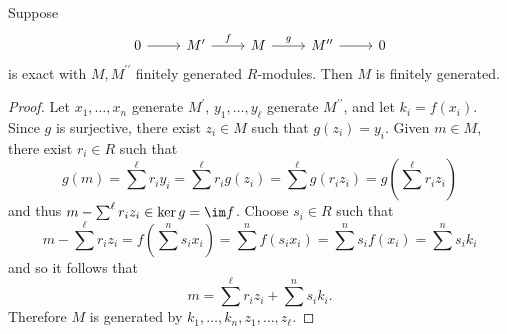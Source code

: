 \documentclass[10pt]{amsart}
\begin{document}
\begin{lem}\label{lem13}
  Suppose
  $$\begin{tikzcd}
    0 \arrow{r} & M^\prime \arrow{r}{f} & M \arrow{r}{g} & M^{\prime\prime} \arrow{r} & 0
  \end{tikzcd}$$
  is exact with $M, M^{\prime\prime}$ finitely generated $R$-modules.
  Then $M$ is finitely generated.

  \begin{proof}
    Let $x_1, \ldots, x_n$ generate $M^\prime$,  $y_1, \ldots, y_\ell$ generate $M^{\prime\prime}$, and let $k_i = f(x_i)$.
    Since $g$ is surjective, there exist $z_i \in M$ such that $g(z_i) = y_i$.
    Given $m \in M$, there exist $r_i \in R$ such that
    $$g(m) = \sum^\ell r_iy_i = \sum^\ell r_ig(z_i) = \sum^\ell g(r_iz_i) = g\left(\sum^\ell r_iz_i\right)$$
    and thus $m - \sum^\ell r_iz_i \in \ker g = \im f$.
    Choose $s_i \in R$ such that
    $$m - \sum^\ell r_iz_i = f\left(\sum^n s_i x_i\right) = \sum^n f(s_ix_i) = \sum^n s_if(x_i) = \sum^n s_ik_i$$
    and so it follows that
    $$m = \sum^\ell r_iz_i + \sum^n s_ik_i.$$
    Therefore $M$ is generated by $k_1, \ldots, k_n, z_1, \ldots, z_\ell$.
  \end{proof}
\end{lem}
\end{document}
